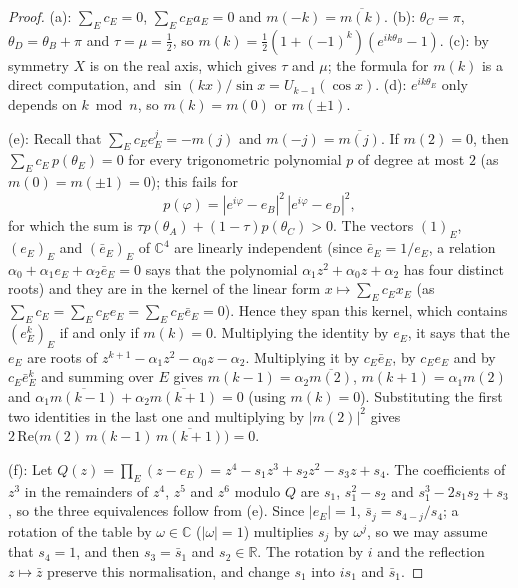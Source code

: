 \documentclass[a4paper,11pt,twoside,leqno]{article}
\newcommand{\rr}[0]{\ensuremath{\mathbb{R}}}
\numberwithin{equation}{section}
\begin{document}
\begin{proof}
(a): $\sum_E c_E = 0$, $\sum_E c_E a_E = 0$ and $m(-k) = \overline{m(k)}$. (b): $\theta_C = \pi$, $\theta_D = \theta_B + \pi$ and $\tau = \mu = \frac{1}{2}$, so $m(k) = \frac{1}{2}(1+(-1)^k)(e^{ik\theta_B}-1)$. (c): by symmetry $X$ is on the real axis, which gives $\tau$ and $\mu$; the formula for $m(k)$ is a direct computation, and $\sin(k x)/\sin x = U_{k-1}(\cos x)$. (d): $e^{ik\theta_E}$ only depends on $k \bmod n$, so $m(k) = m(0)$ or $m(\pm 1)$.

(e): Recall that $\sum_E c_E e_E^j = -m(j)$ and $m(-j) = \overline{m(j)}$. If $m(2) = 0$, then $\sum_E c_E\, p(\theta_E) = 0$ for every trigonometric polynomial $p$ of degree at most $2$ (as $m(0) = m(\pm 1) = 0$); this fails for
\[
p(\varphi) = |e^{i\varphi} - e_B|^2\, |e^{i\varphi} - e_D|^2,
\]
for which the sum is $\tau p(\theta_A) + (1-\tau) p(\theta_C) > 0$. The vectors $(1)_E$, $(e_E)_E$ and $(\bar e_E)_E$ of $\mathbb{C}^4$ are linearly independent (since $\bar e_E = 1/e_E$, a relation $\alpha_0 + \alpha_1 e_E + \alpha_2 \bar e_E = 0$ says that the polynomial $\alpha_1 z^2 + \alpha_0 z + \alpha_2$ has four distinct roots) and they are in the kernel of the linear form $x \mapsto \sum_E c_E x_E$ (as $\sum_E c_E = \sum_E c_E e_E = \sum_E c_E \bar e_E = 0$). Hence they span this kernel, which contains $(e_E^k)_E$ if and only if $m(k) = 0$. Multiplying the identity by $e_E$, it says that the $e_E$ are roots of $z^{k+1} - \alpha_1 z^2 - \alpha_0 z - \alpha_2$. Multiplying it by $c_E \bar e_E$, by $c_E e_E$ and by $c_E \bar e_E^k$ and summing over $E$ gives $m(k-1) = \alpha_2 \overline{m(2)}$, $m(k+1) = \alpha_1 m(2)$ and $\alpha_1 \overline{m(k-1)} + \alpha_2 \overline{m(k+1)} = 0$ (using $m(k) = 0$). Substituting the first two identities in the last one and multiplying by $|m(2)|^2$ gives $2\,\mathrm{Re}\big(m(2)\, m(k-1)\, \overline{m(k+1)}\big) = 0$.

(f): Let $Q(z) = \prod_E (z - e_E) = z^4 - s_1 z^3 + s_2 z^2 - s_3 z + s_4$. The coefficients of $z^3$ in the remainders of $z^4$, $z^5$ and $z^6$ modulo $Q$ are $s_1$, $s_1^2 - s_2$ and $s_1^3 - 2 s_1 s_2 + s_3$, so the three equivalences follow from (e). Since $|e_E| = 1$, $\bar s_j = s_{4-j}/s_4$; a rotation of the table by $\omega \in \mathbb{C}$ ($|\omega| = 1$) multiplies $s_j$ by $\omega^j$, so we may assume that $s_4 = 1$, and then $s_3 = \bar s_1$ and $s_2 \in \rr$. The rotation by $i$ and the reflection $z \mapsto \bar z$ preserve this normalisation, and change $s_1$ into $i s_1$ and $\bar s_1$.


\end{proof}
\end{document}

